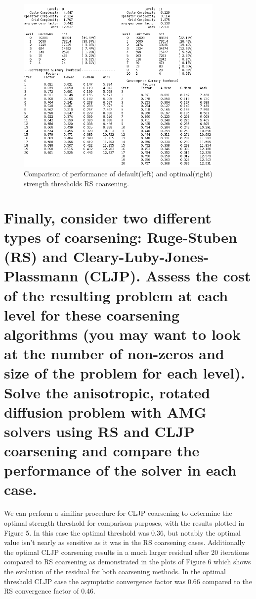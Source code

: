 \documentclass[letterpaper,10pt]{article}
\begin{document}
\begin{figure}[!htb]
\centering
\includegraphics[width=0.9\textwidth]{RS2546tab.PNG}
\caption{Comparison of performance of default(left) and optimal(right) strength thresholds RS coarsening.}
\end{figure}

\clearpage

\section*{Finally, consider two different types of coarsening: Ruge-Stuben (RS) and Cleary-Luby-Jones-Plassmann (CLJP). Assess the cost of the resulting problem at each level for these coarsening algorithms (you may want to look at the number of non-zeros and size of the problem for each level). Solve the anisotropic, rotated diffusion problem with AMG solvers using RS and CLJP coarsening and compare the performance of the solver in each case.}

We can perform a similiar procedure for CLJP coarsening to determine the optimal strength threshold for comparison purposes, with the results plotted in Figure 5. In this case the optimal threshold was 0.36, but notably the optimal value isn't nearly as sensitive as it was in the RS coarsening cases. Additionally the optimal CLJP coarsening results in a much larger residual after 20 iterations compared to RS coarsening as demonstrated in the plots of Figure 6 which shows the evolution of the residual for both coarsening methods. In the optimal threshold CLJP case the asymptotic convergence factor was 0.66 compared to the RS convergence factor of 0.46.
\end{document}
